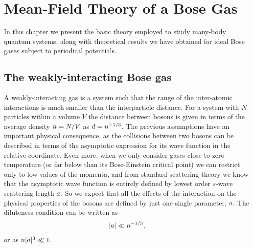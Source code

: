 \chapter{Mean-Field Theory of a Bose Gas}%
\label{chap:mean-field-theory}


In this chapter we present the basic theory employed to study many-body quantum
systems, along with theoretical results we have obtained for ideal Bose gases
subject to periodical potentials.


\section{The weakly-interacting Bose gas}
\label{sec:the-weakly-interacting-bose-gas}

A weakly-interacting gas is a system such that the range of the inter-atomic
interactions is much smaller than the interparticle distance. For a system with
$N$ particles within a volume $V$ the distance between bosons is given in terms
of the average density ${n} = N / V$ as $d = {n}^{-1/3}$. The previous
assumptions have an important physical consequence, as the collisions between
two bosons can be described in terms of the asymptotic expression for its wave
function in the relative coordinate. Even more, when we only consider gases
close to zero temperature (or far below than its Bose-Einstein critical point)
we can restrict only to low values of the momenta, and from standard scattering
theory we know that the asymptotic wave function is entirely defined by lowest
order $s$-wave scattering length $a$. So we expect that all the effects of the
interaction on the physical properties of the bosons are defined by just one
single parameter, $a$. The diluteness condition can be written as
%
\begin{equation}
  \label{eq:diluteness-condition}
  |a| \ll n^{-1/3},
\end{equation}
%
or as $n |a|^3 \ll 1$.

